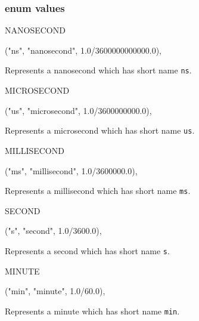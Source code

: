 \subsubsection* {enum values}
\begin{code}

   NANOSECOND\begin{hide}

("ns", "nanosecond", 1.0/3600000000000.0),
\end{hide}
\end{code}
\begin{tabb}   Represents a nanosecond which has short name \texttt{ns}.
\end{tabb}
\begin{code}

   MICROSECOND\begin{hide}

("us", "microsecond", 1.0/3600000000.0),
\end{hide}
\end{code}
\begin{tabb}   Represents a microsecond which has short name \texttt{us}.
\end{tabb}
\begin{code}

   MILLISECOND\begin{hide}

("ms", "millisecond", 1.0/3600000.0),
\end{hide}
\end{code}
\begin{tabb}   Represents a millisecond which has short name \texttt{ms}.
\end{tabb}
\begin{code}

   SECOND\begin{hide}

("s", "second", 1.0/3600.0),
\end{hide}
\end{code}
\begin{tabb}   Represents a second which has short name \texttt{s}.
\end{tabb}
\begin{code}

   MINUTE\begin{hide}

("min", "minute", 1.0/60.0),
\end{hide}
\end{code}
\begin{tabb}   Represents a minute which has short name \texttt{min}.
\end{tabb}

